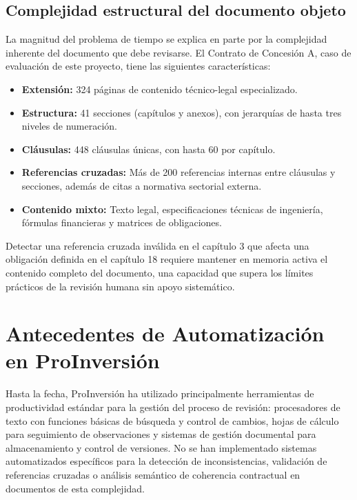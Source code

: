 \subsection{Complejidad estructural del documento objeto}

La magnitud del problema de tiempo se explica en parte por la complejidad inherente
del documento que debe revisarse. El Contrato de Concesión A, caso de evaluación
de este proyecto, tiene las siguientes características:

\begin{itemize}
    \item \textbf{Extensión:} 324 páginas de contenido técnico-legal especializado.
    \item \textbf{Estructura:} 41 secciones (capítulos y anexos), con jerarquías
    de hasta tres niveles de numeración.
    \item \textbf{Cláusulas:} 448 cláusulas únicas, con hasta 60 por capítulo.
    \item \textbf{Referencias cruzadas:} Más de 200 referencias internas entre
    cláusulas y secciones, además de citas a normativa sectorial externa.
    \item \textbf{Contenido mixto:} Texto legal, especificaciones técnicas de
    ingeniería, fórmulas financieras y matrices de obligaciones.
\end{itemize}

Detectar una referencia cruzada inválida en el capítulo 3 que afecta una obligación
definida en el capítulo 18 requiere mantener en memoria activa el contenido completo
del documento, una capacidad que supera los límites prácticos de la revisión humana
sin apoyo sistemático.

\section{Antecedentes de Automatización en ProInversión}

Hasta la fecha, ProInversión ha utilizado principalmente herramientas de productividad
estándar para la gestión del proceso de revisión: procesadores de texto con funciones
básicas de búsqueda y control de cambios, hojas de cálculo para seguimiento de
observaciones y sistemas de gestión documental para almacenamiento y control de
versiones. No se han implementado sistemas automatizados específicos para la detección
de inconsistencias, validación de referencias cruzadas o análisis semántico de
coherencia contractual en documentos de esta complejidad.

